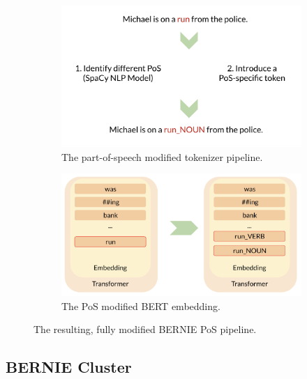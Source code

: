 \documentclass[a4paper,12pt,oneside,openright]{report}
\begin{document}
\begin{figure}
\begin{subfigure}{.52\textwidth}
  \centering
  \includegraphics[width=0.8\linewidth]{./assets/experiments/pipeline_tokenizer_BERnie_POS_sentence.png}
  \caption{The part-of-speech modified tokenizer pipeline.}
  \label{fig:sfig1}
\end{subfigure}%
\hfill
\begin{subfigure}{.54\textwidth}
  \centering
  \includegraphics[width=\linewidth]{./assets/experiments/pipeline_model_BERnie_POS.png}
  \caption{The PoS modified BERT embedding.}
  \label{fig:sfig2}
\end{subfigure}
\caption{The resulting, fully modified BERNIE PoS pipeline.}
\label{fig:BERNIE_POS_full_pipeline}
\end{figure}

\subsection{BERNIE Cluster}\label{experiment_bernie_meaning}
\end{document}
